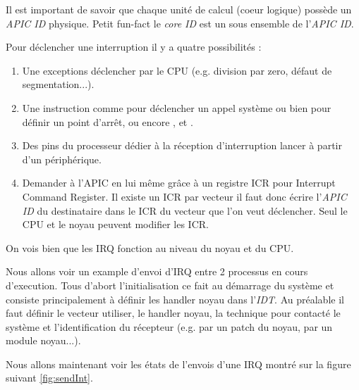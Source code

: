 Il est important de savoir que chaque unité de calcul (coeur logique) possède un \emph{APIC ID} physique.
Petit fun-fact le \emph{core ID} est un sous ensemble de l'\emph{APIC ID}.

Pour déclencher une interruption il y a quatre possibilités :

\begin{enumerate}
  \item Une exceptions déclencher par le CPU (e.g. division par zero, défaut de segmentation...).
  \item Une instruction comme  pour déclencher un appel système ou bien  pour définir un point d'arrêt, ou encore ,  et .
  \item Des pins du processeur dédier à la réception d'interruption lancer à partir d'un périphérique.
  \item Demander à l'APIC en lui même grâce à un registre ICR pour Interrupt Command Register.
  Il existe un ICR par vecteur il faut donc écrire l'\emph{APIC ID} du destinataire dans le ICR du vecteur que l'on veut déclencher.
  Seul le CPU et le noyau peuvent modifier les ICR.
\end{enumerate}

On vois bien que les IRQ fonction au niveau du noyau et du CPU.

Nous allons voir un example d'envoi d'IRQ entre 2 processus en cours d'execution.
Tous d'abort l'initialisation ce fait au démarrage du système et consiste principalement à définir les handler noyau dans l'\emph{IDT}.
Au préalable il faut définir le vecteur utiliser, le handler noyau, la technique pour contacté le système et l'identification du récepteur (e.g. par un patch du noyau, par un module noyau...).

Nous allons maintenant voir les états de l'envois d'une IRQ montré sur la figure suivant \ref{fig:sendInt}.

